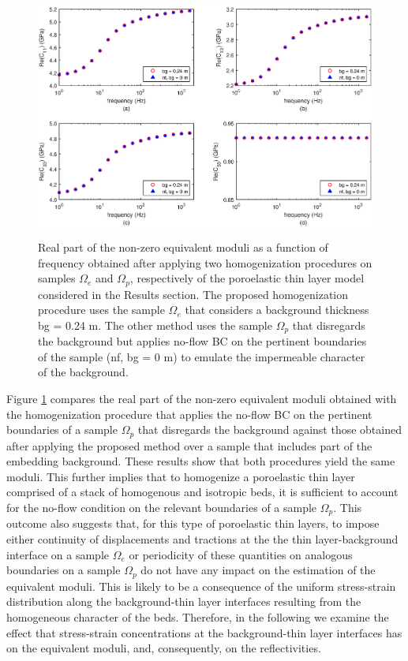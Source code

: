 \documentclass[draft]{agujournal2019}
\begin{document}
\begin{figure}[!ht]
\centering
        \includegraphics[width= 120mm, height=80mm]{Figure6.eps}
\caption{Real part of the non-zero equivalent moduli as a function of frequency obtained after applying two homogenization procedures on samples $\Omega_e$ and  $\Omega_p$, respectively of the poroelastic thin layer model considered in the Results section. The proposed homogenization procedure uses the sample $\Omega_e$ that considers a background thickness bg = 0.24 m. The other method uses the sample $\Omega_p$ that disregards the background but applies no-flow BC on the pertinent boundaries of the sample (nf, bg = 0 m) to emulate the impermeable character of the background.}
\label{fig.6}
\end{figure}

Figure \ref{fig.6} compares the real part of the non-zero equivalent moduli obtained with the homogenization procedure that applies the no-flow BC on the pertinent boundaries of a sample $\Omega_p$  that disregards the background against those obtained after applying the proposed method over a sample that includes part of the embedding background. These results show that both procedures yield the same moduli. This further implies that to homogenize a poroelastic thin layer comprised of a stack of homogenous and isotropic beds, it is sufficient to account for the no-flow condition on the relevant boundaries of a sample $\Omega_p$. This outcome also suggests that, for this type of poroelastic thin layers, to impose either continuity of displacements and tractions at the the thin layer-background interface on a sample $\Omega_e$ or periodicity of these quantities on analogous boundaries on a sample $\Omega_p$ do not have any impact on the estimation of the equivalent moduli.
This is likely to be a consequence of the uniform stress-strain distribution along the background-thin layer interfaces resulting from the homogeneous character of the beds. Therefore, in the following  we examine the effect that stress-strain concentrations at the background-thin layer interfaces has on the equivalent moduli, and, consequently, on the reflectivities.
\end{document}
